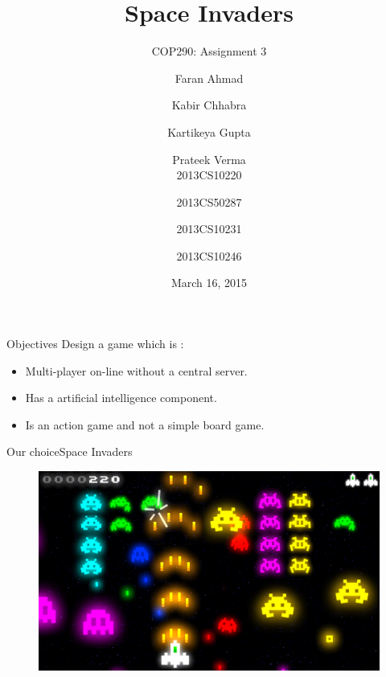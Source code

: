 \documentclass{beamer}
\title[COP 290]{Space Invaders}
\subtitle{COP290: Assignment 3}
\author[Faran \and Kabir \and Kartikeya \and Prateek]{Faran Ahmad \and Kabir Chhabra \and Kartikeya Gupta \and Prateek Verma \\
  2013CS10220 \and 2013CS50287 \and 2013CS10231 \and 2013CS10246}
\institute[IITD] %
{
  Department of Computer Science and Engineering\\
  IIT Delhi
}
\date{March 16, 2015}
\begin{document}
\begin{frame}
  \titlepage
\end{frame}


\begin{frame}{Objectives}{}
	Design a game which is :
	\begin{itemize}
		\item Multi-player on-line without a central server.
		\item Has a artificial intelligence component.
		\item Is an action game and not a simple board game.
	\end{itemize}
\end{frame}

\begin{frame}{Our choice}{Space Invaders}
    \begin{figure}[ht!]
      \centering
          \includegraphics[width=1.0\linewidth]{gameplay.png}
    \end{figure}
\end{frame}
\end{document}
